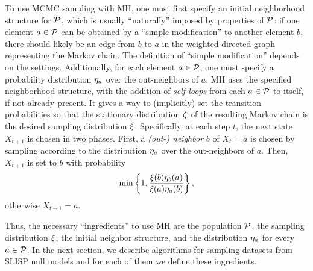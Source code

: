 To use MCMC sampling with MH, one must first specify an initial neighborhood
structure for $\mathcal{P}$, which is usually ``naturally'' imposed by
properties of $\mathcal{P}$: if one element $a \in \mathcal{P}$ can be obtained
by a ``simple modification'' to another element $b$, there should likely be an
edge from $b$ to $a$ in the weighted directed graph representing the Markov
chain. The definition of ``simple modification'' depends on the settings.
Additionally, for each element $a \in \mathcal{P}$, one must specify a
probability distribution $\eta_a$ over the out-neighbors of $a$.
MH uses the specified neighborhood structure, with the addition
of \emph{self-loops} from each $a \in \mathcal{P}$ to itself, if not already
present. It gives a way to (implicitly) set the transition probabilities so that
the stationary distribution $\zeta$ of the resulting Markov chain is the
desired sampling distribution $\xi$. Specifically, at each step $t$, the
next state $X_{t+1}$ is chosen in two phases. First, a \emph{(out-) neighbor}
$b$ of $X_t=a$ is chosen by sampling according to the distribution
$\eta_a$ over the out-neighbors of $a$. Then, $X_{t+1}$ is set to $b$ with
probability
\begin{equation}\label{eq:metropolis}
  \min \left\{1, \frac{\xi(b) \eta_b(a)}{\xi(a)
  \eta_a(b)} \right\},
\end{equation}
otherwise $X_{t+1}=a$.

Thus, the necessary ``ingredients'' to use MH are the population $\mathcal{P}$,
the sampling distribution $\xi$, the initial neighbor structure, and the
distribution $\eta_a$ for every $a \in \mathcal{P}$. In the next section,
we describe algorithms for sampling datasets from SLISP null models and for each
of them we define these ingredients.
